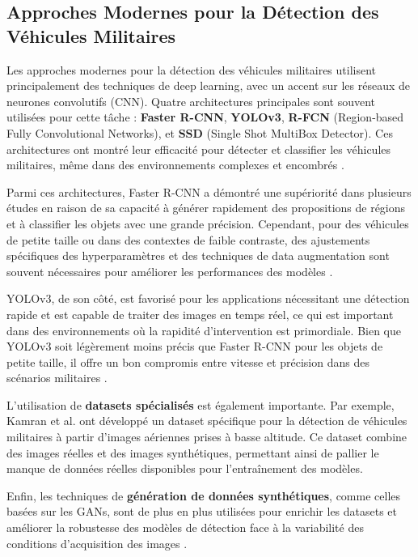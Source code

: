 \subsection{Approches Modernes pour la Détection des Véhicules Militaires}

Les approches modernes pour la détection des véhicules militaires utilisent principalement des techniques de deep learning, avec un accent sur les réseaux de neurones convolutifs (CNN). Quatre architectures principales sont souvent utilisées pour cette tâche : \textbf{Faster R-CNN}, \textbf{YOLOv3}, \textbf{R-FCN} (Region-based Fully Convolutional Networks), et \textbf{SSD} (Single Shot MultiBox Detector). Ces architectures ont montré leur efficacité pour détecter et classifier les véhicules militaires, même dans des environnements complexes et encombrés \cite{kamran2020, gupta2021}.

Parmi ces architectures, Faster R-CNN a démontré une supériorité dans plusieurs études en raison de sa capacité à générer rapidement des propositions de régions et à classifier les objets avec une grande précision. Cependant, pour des véhicules de petite taille ou dans des contextes de faible contraste, des ajustements spécifiques des hyperparamètres et des techniques de data augmentation sont souvent nécessaires pour améliorer les performances des modèles \cite{gupta2021}.

YOLOv3, de son côté, est favorisé pour les applications nécessitant une détection rapide et est capable de traiter des images en temps réel, ce qui est important dans des environnements où la rapidité d'intervention est primordiale. Bien que YOLOv3 soit légèrement moins précis que Faster R-CNN pour les objets de petite taille, il offre un bon compromis entre vitesse et précision dans des scénarios militaires \cite{gupta2021}.

L'utilisation de \textbf{datasets spécialisés} est également importante. Par exemple, Kamran et al. \cite{kamran2020} ont développé un dataset spécifique pour la détection de véhicules militaires à partir d'images aériennes prises à basse altitude. Ce dataset combine des images réelles et des images synthétiques, permettant ainsi de pallier le manque de données réelles disponibles pour l'entraînement des modèles.

Enfin, les techniques de \textbf{génération de données synthétiques}, comme celles basées sur les GANs, sont de plus en plus utilisées pour enrichir les datasets et améliorer la robustesse des modèles de détection face à la variabilité des conditions d'acquisition des images \cite{spie2020}.




